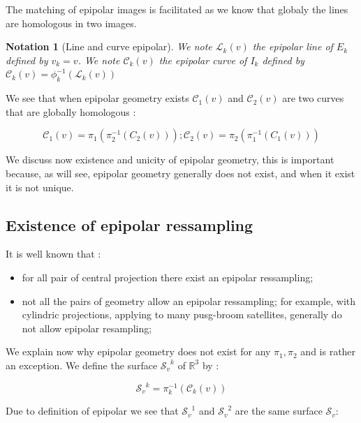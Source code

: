\documentclass[a4paper]{article}
\newcommand{\RR}{\ensuremath{\mathbb{R}}}
\newcommand{\PiOT}[1]{\pi_1(\pi_2^{-1}(#1))}
\newcommand{\PiTO}[1]{\pi_2(\pi_1^{-1}(#1))}
\newcommand{\LineE}[1]{\ensuremath{\mathcal{L}_{#1}}}
\newcommand{\LineK}{\LineE{k}}
\newcommand{\CurveE}[1]{\ensuremath{\mathcal{C}_{#1}}}
\newcommand{\CurveO}{\CurveE{1}}
\newcommand{\CurveT}{\CurveE{2}}
\newcommand{\CurveK}{\CurveE{k}}
\newcommand{\Sv}{\ensuremath{\mathcal{S}_{v}}}
\newtheorem{notation}{Notation}
\begin{document}
The matching of epipolar images is facilitated as we know that globaly the lines are homologous
in two images. 

\begin{notation}[Line and curve epipolar]
We note $\LineK(v)$   the epipolar  line of $E_k$ defined by $v_k=v$. We note $\CurveK(v)$ the epipolar
curve of $I_k$ defined by $\CurveK(v) = \phi_k^{-1}(\LineK(v))$
\end{notation}


We see that when epipolar geometry exists $\CurveO(v)$ and $\CurveT(v)$ are two curves 
that are globally homologous :

\begin{equation}
     \CurveO(v) = \PiOT{C_2(v)}   ;  \CurveT(v) = \PiTO{C_1(v)} \label{Eq:CurvHom}
\end{equation}

We discuss now existence and unicity of epipolar geometry, this is important because,
as will see, epipolar geometry generally does not exist, and when it exist it is not
unique.



\subsection{Existence of epipolar ressampling}

\label{ExistEpip}

It is well known that :

\begin{itemize}
    \item for all pair of central projection there exist  an epipolar ressampling;

    \item  not all the pairs of geometry allow an epipolar ressampling; for example, with cylindric 
          projections, applying to many pusg-broom satellites, generally do not allow epipolar resampling;

\end{itemize}

We explain now why epipolar geometry does not exist for any $\pi_1,\pi_2$ and is rather an exception.
We define the surface $\Sv^k$ of $\RR^3$ by :

\begin{equation}
   \Sv^k = \pi_k^{-1}(\CurveK(v))  \label{Svk}
\end{equation}

Due to definition of epipolar we see that $\Sv^1$ and $\Sv^2$ are the same surface $\Sv$:
\end{document}

